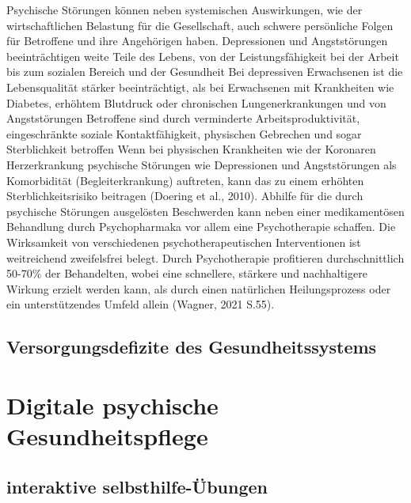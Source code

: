 Psychische Störungen können neben systemischen Auswirkungen, wie der wirtschaftlichen Belastung für die Gesellschaft, auch schwere persönliche Folgen für Betroffene und ihre Angehörigen haben. Depressionen und Angststörungen beeinträchtigen weite Teile des Lebens, von der Leistungsfähigkeit bei der Arbeit bis zum sozialen Bereich und der Gesundheit \cite[]{brenes2007anxiety} %
Bei depressiven Erwachsenen ist die Lebensqualität stärker beeinträchtigt, als bei Erwachsenen mit Krankheiten wie Diabetes, erhöhtem Blutdruck oder chronischen Lungenerkrankungen und von Angststörungen Betroffene sind durch verminderte Arbeitsproduktivität, eingeschränkte soziale Kontaktfähigkeit, physischen Gebrechen und sogar Sterblichkeit betroffen \cite[]{weisel2021digital,brenes2007anxiety}  %
Wenn bei physischen Krankheiten wie der Koronaren Herzerkrankung psychische Störungen wie Depressionen und Angststörungen als Komorbidität (Begleiterkrankung) auftreten, kann das zu einem erhöhten Sterblichkeitsrisiko beitragen (Doering et al., 2010). 
Abhilfe für die durch psychische Störungen ausgelösten Beschwerden kann neben einer medikamentösen Behandlung durch Psychopharmaka vor allem eine Psychotherapie schaffen. Die Wirksamkeit von verschiedenen psychotherapeutischen Interventionen ist weitreichend zweifelsfrei belegt. Durch Psychotherapie profitieren durchschnittlich 50-70\% der Behandelten, wobei eine schnellere, stärkere und nachhaltigere Wirkung erzielt werden kann, als durch einen natürlichen Heilungsprozess oder ein unterstützendes Umfeld allein (Wagner, 2021 S.55).



\subsection{Versorgungsdefizite des Gesundheitssystems}\label{subsubsec:versorgungsdefizite}



\section{Digitale psychische Gesundheitspflege}\label{subsec:digitale_psychische_gesundheit}


\subsection{interaktive selbsthilfe-Übungen}\label{subsubsec:interaktive_selbsthilfe_uebungen}

